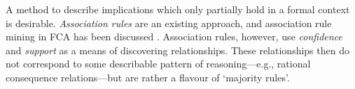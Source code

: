 A method to describe implications which only partially hold in a formal context is desirable. \textit{Association rules} are an existing approach, and association rule mining in FCA has been discussed \cite{ganter2016conceptual,lakhal2005efficient}. Association rules, however, use \textit{confidence} and \textit{support} as a means of discovering relationships. These relationships then do not correspond to some describable pattern of reasoning—e.g., rational consequence relations—but are rather a flavour of `majority rules'.

